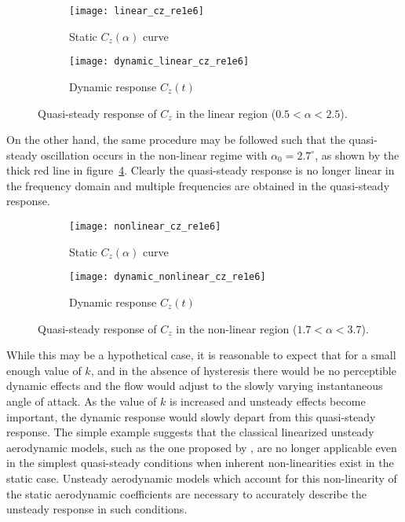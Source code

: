 \begin{figure}[h]
	\centering
	\begin{subfigure}[b]{0.45\textwidth}
		\centering
		\texttt{[image: linear\_cz\_re1e6]}
		\caption{Static $C_{z}(\alpha)$ curve}
		\label{fig:static_linear}
	\end{subfigure}
	\begin{subfigure}[b]{0.45\textwidth}
		\centering
		\texttt{[image: dynamic\_linear\_cz\_re1e6]}
		\caption{Dynamic response $C_{z}(t)$}
		\label{fig:dynamic_linear}
	\end{subfigure}
	\caption{Quasi-steady response of $C_{z}$ in the linear region ($0.5<\alpha<2.5$).}
	\label{fig:linear_cz_response}
\end{figure}
On the other hand, the same procedure may be followed such that the quasi-steady oscillation occurs in the non-linear regime with $\alpha_{0}=2.7^{\circ}$, as shown by the thick red line in figure~\ref{fig:static_nonlinear}. Clearly the quasi-steady response is no longer linear in the frequency domain and multiple frequencies are obtained in the quasi-steady response.
\begin{figure}[h]
	\centering
	\begin{subfigure}[b]{0.45\textwidth}
		\centering
		\texttt{[image: nonlinear\_cz\_re1e6]}
		\caption{Static $C_{z}(\alpha)$ curve}
		\label{fig:static_nonlinear}
	\end{subfigure}
	\begin{subfigure}[b]{0.45\textwidth}
		\centering
		\texttt{[image: dynamic\_nonlinear\_cz\_re1e6]}
		\caption{Dynamic response $C_{z}(t)$}
		\label{fig:dynamic_nonlinear}
	\end{subfigure}
	\caption{Quasi-steady response of $C_{z}$ in the non-linear region ($1.7<\alpha<3.7$).}
	\label{fig:nonlinear_cz_response}
\end{figure}
While this may be a hypothetical case, it is reasonable to expect that for a small enough value of $k$, and in the absence of hysteresis there would be no perceptible dynamic effects and the flow would adjust to the slowly varying instantaneous angle of attack. As the value of $k$ is increased and unsteady effects become important, the dynamic response would slowly depart from this quasi-steady response. The simple example suggests that the classical linearized unsteady aerodynamic models, such as the one proposed by \cite{theodorsen35}, are no longer applicable even in the simplest quasi-steady conditions when inherent non-linearities exist in the static case. Unsteady aerodynamic models which account for this non-linearity of the static aerodynamic coefficients are necessary to accurately describe the unsteady response in such conditions.

